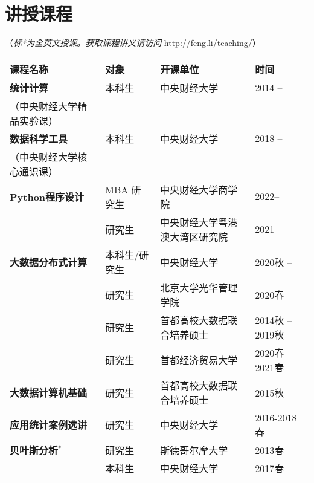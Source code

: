 \documentclass[twoside,a4paper,11pt]{article}
\begin{document}
\section*{讲授课程}
（\emph{标*为全英文授课。获取课程讲义请访问} \url{http://feng.li/teaching/}）

\begin{tabular}{l l ll}
  \toprule
  课程名称                                  & 对象          & 开课单位                       & 时间             \\
  \midrule
  \textbf{统计计算}                         & 本科生        & 中央财经大学                   & 2014 --          \\
  \footnotesize{（中央财经大学精品实验课）} &               &                                &                  \\
  \textbf{数据科学工具}                     & 本科生        & 中央财经大学                   & 2018 --          \\
  \footnotesize{（中央财经大学核心通识课）} &               &                                &                  \\
  \textbf{Python程序设计}                   & MBA 研究生        & 中央财经大学商学院 & 2022--           \\
                     & 研究生        & 中央财经大学粤港澳大湾区研究院 & 2021--           \\
  \textbf{大数据分布式计算}                 & 本科生/研究生 & 中央财经大学                   & 2020秋 --        \\
                                            & 研究生        & 北京大学光华管理学院           & 2020春 --        \\
                                            & 研究生        & 首都高校大数据联合培养硕士     & 2014秋 -- 2019秋 \\
                                            & 研究生        & 首都经济贸易大学               & 2020春 --2021春        \\
  \textbf{大数据计算机基础}                 & 研究生        & 首都高校大数据联合培养硕士     & 2015秋           \\
  \textbf{应用统计案例选讲}                 & 研究生        & 中央财经大学                   & 2016-2018春      \\
  \textbf{贝叶斯分析}$^*$                   & 研究生        & 斯德哥尔摩大学                 & 2013春           \\
                                            & 本科生        & 中央财经大学                   & 2017春           \\

\end{tabular}
\end{document}
